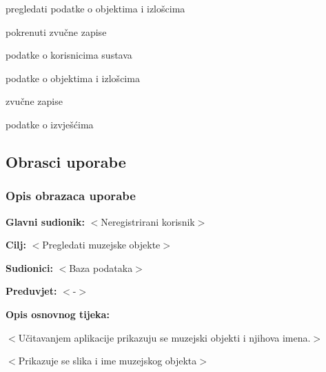 \begin{packed_enum}
\begin{packed_enum}
		\item pregledati podatke o objektima i izlošcima
		\item pokrenuti zvučne zapise
		
	\end{packed_enum}
	
	\item  {}
	
	\begin{packed_enum}
		
		\item podatke o korisnicima sustava
		\item podatke o objektima i izlošcima
		\item zvučne zapise
		\item podatke o izvješćima
		
	\end{packed_enum}
\end{packed_enum}


\eject 



\subsection{Obrasci uporabe}

\subsubsection{Opis obrazaca uporabe}


	\noindent {}
	\begin{packed_item}
		
		\item \textbf{Glavni sudionik: }$<$Neregistrirani korisnik$>$
		\item  \textbf{Cilj:} $<$Pregledati muzejske objekte$>$
		\item  \textbf{Sudionici:} $<$Baza podataka$>$
		\item  \textbf{Preduvjet:} $<$-$>$
		\item  \textbf{Opis osnovnog tijeka:}
		
		\item[] \begin{packed_enum}
			
			\item $<$Učitavanjem aplikacije prikazuju se muzejski objekti i njihova imena.$>$
			\item $<$Prikazuje se slika i ime muzejskog objekta$>$
		\end{packed_enum}
		
	\end{packed_item}
	
